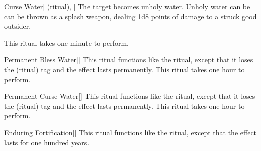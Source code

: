 \lowercase{\hypertarget{spell:Curse Water}{}}\label{spell:Curse Water}
\begin{attuneability}[\nth{1}]{\hypertarget{spell:Curse Water}{Curse Water}}[ (ritual), ]
The target becomes unholy water.
Unholy water can be can be thrown as a splash weapon, dealing 1d8 points of damage to a struck good outsider.

This ritual takes one minute to perform.
\end{attuneability}
\vspace{0.25em}



\lowercase{\hypertarget{spell:Permanent Bless Water}{}}\label{spell:Permanent Bless Water}
\begin{apability}[\nth{2}]{\hypertarget{spell:Permanent Bless Water}{Permanent Bless Water}}[]
This ritual functions like the  ritual, except that it loses the  (ritual) tag and the effect lasts permanently.
This ritual takes one hour to perform.
\end{apability}
\vspace{0.25em}



\lowercase{\hypertarget{spell:Permanent Curse Water}{}}\label{spell:Permanent Curse Water}
\begin{apability}[\nth{2}]{\hypertarget{spell:Permanent Curse Water}{Permanent Curse Water}}[]
This ritual functions like the  ritual, except that it loses the  (ritual) tag and the effect lasts permanently.
This ritual takes one hour to perform.
\end{apability}
\vspace{0.25em}



\lowercase{\hypertarget{spell:Enduring Fortification}{}}\label{spell:Enduring Fortification}
\begin{apability}[\nth{3}]{\hypertarget{spell:Enduring Fortification}{Enduring Fortification}}[]
This ritual functions like the  ritual, except that the effect lasts for one hundred years.
\end{apability}
\vspace{0.25em}



